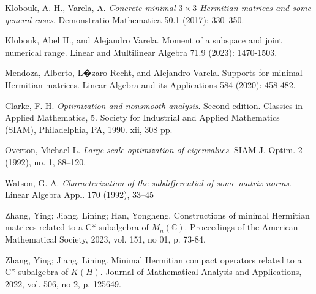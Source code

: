 \documentclass[12pt,a4paper]{article}
\def\C{\mathbb C}
\numberwithin{equation}{section}
\begin{document}
\begin{thebibliography}{}
 Klobouk, A. H., Varela, A. \textit{Concrete minimal $3\times 3$ Hermitian matrices and some general cases}. Demonstratio Mathematica 50.1 (2017): 330--350.


 Klobouk, Abel H., and Alejandro Varela. Moment of a subspace and joint numerical range. Linear and Multilinear Algebra 71.9 (2023): 1470-1503.

 Mendoza, Alberto, L�zaro Recht, and Alejandro Varela. Supports for minimal Hermitian matrices. Linear Algebra and its Applications 584 (2020): 458-482.


 Clarke, F. H. \textit{Optimization and nonsmooth analysis}. Second edition. Classics in Applied Mathematics, 5. Society for Industrial and Applied Mathematics (SIAM), Philadelphia, PA, 1990. {\rm xii}, 308 pp. 


 Overton, Michael L. \textit{Large-scale optimization of eigenvalues}. SIAM J. Optim. 2 (1992), no. 1, 88--120.

 Watson, G. A. \textit{Characterization of the subdifferential of some matrix norms}. Linear Algebra Appl. 170 (1992), 33--45

 Zhang, Ying; Jiang, Lining; Han, Yongheng. Constructions of minimal Hermitian matrices related to a C*-subalgebra of $M_n(\C)$. Proceedings of the American Mathematical Society, 2023, vol. 151, no 01, p. 73-84.

 Zhang, Ying; Jiang, Lining. Minimal Hermitian compact operators related to a C*-subalgebra of $K(H)$. Journal of Mathematical Analysis and Applications, 2022, vol. 506, no 2, p. 125649.
\end{thebibliography}
\end{document}
